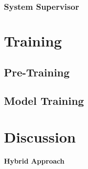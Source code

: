 \documentclass{article}
\begin{document}
            \subsubsection{System Supervisor}

	\section{Training}

        \subsection{Pre-Training}

        \subsection{Model Training}

	\section{Discussion}

        \paragraph{Hybrid Approach}
\end{document}
